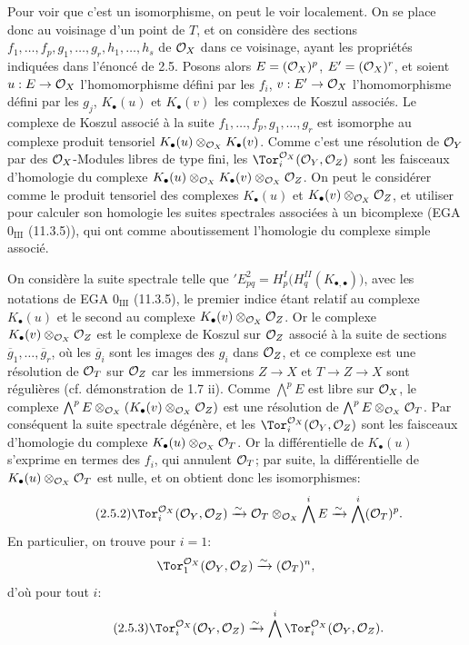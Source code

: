 Pour voir que c'est un isomorphisme, on peut le voir localement. On se place donc au voisinage d'un point de \(T\), et on considère des sections \(f_1,\ldots,f_p,g_1,\ldots,g_r,h_1,\ldots,h_s\) de \(\mathcal O_X\) dans ce voisinage, ayant les propriétés indiquées dans l'énoncé de 2.5. Posons alors \(E=(\mathcal O_X)^p\), \(E'=(\mathcal O_X)^r\), et soient \(u:E\to\mathcal O_X\) l'homomorphisme défini par les \(f_i\), \(v:E'\to\mathcal O_X\) l'homomorphisme défini par les \(g_j\), \(K_\bullet(u)\) et \(K_\bullet(v)\) les
complexes de Koszul associés. Le complexe de Koszul associé à la suite \(f_1,\ldots,f_p,g_1,\ldots,g_r\) est isomorphe au complexe produit tensoriel \(K_\bullet(u)\otimes_{\mathcal O_X}K_\bullet(v)\). Comme c'est une résolution de \(\mathcal O_Y\) par des \(\mathcal O_X\)-Modules libres de type fini, les \(\Tor_i^{\cO_X}(\cO_Y,\cO_Z)\) sont les faisceaux d'homologie du complexe \(K_\bullet(u)\otimes_{\mathcal O_X}K_\bullet(v)\otimes_{\mathcal O_X}\mathcal O_Z\). On peut le considérer comme le produit tensoriel des complexes \(K_\bullet(u)\) et \(K_\bullet(v)\otimes_{\mathcal O_X}\mathcal O_Z\), et utiliser pour calculer son homologie les suites spectrales associées à un bicomplexe (EGA \(0_{\mathrm{III}}\) (11.3.5)), qui ont comme aboutissement l'homologie du complexe simple associé.

On considère la suite spectrale telle que \({}'E^2_{pq}=H^I_p\bigl(H^{II}_q(K_{\bullet,\bullet})\bigr)\), avec les notations de EGA \(0_{\mathrm{III}}\) (11.3.5), le premier indice étant relatif au complexe \(K_\bullet(u)\) et le second au complexe \(K_\bullet(v)\otimes_{\mathcal O_X}\mathcal O_Z\). Or le complexe \(K_\bullet(v)\otimes_{\mathcal O_X}\mathcal O_Z\) est le complexe de Koszul sur \(\mathcal O_Z\) associé à la suite de sections \(\overline g_1,\ldots,\overline g_r\), où les \(\overline g_i\) sont les images des \(g_i\) dans \(\mathcal O_Z\), et ce complexe est une résolution de \(\mathcal O_T\) sur \(\mathcal O_Z\) car les immersions \(Z\to X\) et \(T\to Z\to X\) sont régulières (cf. démonstration de 1.7 ii). Comme \(\bigwedge^p E\) est libre sur \(\mathcal O_X\), le complexe \(\bigwedge^pE\otimes_{\mathcal O_X}(K_\bullet(v)\otimes_{\mathcal O_X}\mathcal O_Z)\) est une résolution de \(\bigwedge^pE\otimes_{\mathcal O_X}\mathcal O_T\). Par conséquent la suite spectrale dégénère, et les \(\Tor_i^{\cO_X}(\cO_Y,\cO_Z)\) sont les faisceaux d'homologie du complexe \(K_\bullet(u)\otimes_{\mathcal O_X}\mathcal O_T\). Or la différentielle de \(K_\bullet(u)\) s'exprime en termes des \(f_i\), qui annulent \(\mathcal O_T\); par suite, la différentielle de \(K_\bullet(u)\otimes_{\mathcal O_X}\mathcal O_T\) est nulle, et on obtient donc les isomorphismes:
\begin{equation}\tag{2.5.2}
\Tor_i^{\cO_X}(\cO_Y,\cO_Z)
\xrightarrow{\sim}
\cO_T\otimes_{\cO_X}\bigwedge^iE
\xrightarrow{\sim}
\bigwedge^i(\cO_T)^p.
\end{equation}
En particulier, on trouve pour \(i=1\):
\[
\Tor_1^{\cO_X}(\cO_Y,\cO_Z)\xrightarrow{\sim}(\cO_T)^n,
\]
d'où pour tout \(i\):
\begin{equation}\tag{2.5.3}
\Tor_i^{\cO_X}(\cO_Y,\cO_Z)
\xrightarrow{\sim}
\bigwedge^i\Tor_i^{\cO_X}(\cO_Y,\cO_Z).
\end{equation}

